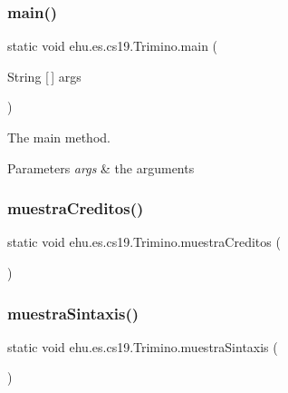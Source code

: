 \subsubsection{\texorpdfstring{main()}{main()}}
{\footnotesize\ttfamily static void ehu.\+es.\+cs19.\+Trimino.\+main (\begin{DoxyParamCaption}\item[{String \mbox{[}$\,$\mbox{]}}]{args }\end{DoxyParamCaption})\hspace{0.3cm}{\ttfamily [static]}}

The main method.


\begin{DoxyParams}{Parameters}
{\em args} & the arguments \\
\hline
\end{DoxyParams}
\mbox{\label{classehu_1_1es_1_1cs19_1_1_trimino_a8f19765e217f2fdf9899c796ae2fb074}} 
\subsubsection{\texorpdfstring{muestraCreditos()}{muestraCreditos()}}
{\footnotesize\ttfamily static void ehu.\+es.\+cs19.\+Trimino.\+muestra\+Creditos (\begin{DoxyParamCaption}{ }\end{DoxyParamCaption})\hspace{0.3cm}{\ttfamily [static]}}

\mbox{\label{classehu_1_1es_1_1cs19_1_1_trimino_a18bc64d050250fd954522df292a24ae2}} 
\subsubsection{\texorpdfstring{muestraSintaxis()}{muestraSintaxis()}}
{\footnotesize\ttfamily static void ehu.\+es.\+cs19.\+Trimino.\+muestra\+Sintaxis (\begin{DoxyParamCaption}{ }\end{DoxyParamCaption})\hspace{0.3cm}{\ttfamily [static]}}

